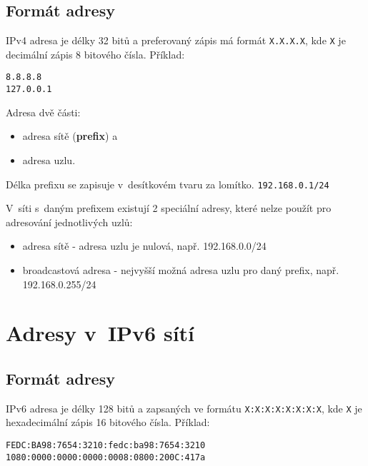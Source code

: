 \subsection{Formát adresy}
IPv4 adresa je délky 32 bitů a preferovaný zápis má formát {\tt X.X.X.X}, kde
{\tt X} je decimální zápis 8 bitového čísla. Příklad:\\
\begin{verbatim}
8.8.8.8
127.0.0.1
\end{verbatim}

Adresa dvě části:
\begin{itemize}
    \item adresa sítě ({\bf prefix}) a
    \item adresa uzlu.
\end{itemize}
Délka prefixu se zapisuje v~desítkovém tvaru za lomítko. {\tt 192.168.0.1/24}

V~síti s~daným prefixem existují 2 speciální adresy, které nelze použít pro
adresování jednotlivých uzlů:
\begin{itemize}
    \item adresa sítě - adresa uzlu je nulová, např. 192.168.0.0/24
    \item broadcastová adresa - nejvyšší možná adresa uzlu pro daný prefix,
        např. 192.168.0.255/24
\end{itemize}

\section{Adresy v~IPv6 sítí}\label{ipv6-teorie}

\subsection{Formát adresy}
IPv6 adresa je délky 128 bitů a zapsaných ve formátu {\tt X:X:X:X:X:X:X:X}, kde
{\tt X} je hexadecimální zápis 16 bitového čísla.
Příklad:\\
\begin{verbatim}
FEDC:BA98:7654:3210:fedc:ba98:7654:3210
1080:0000:0000:0000:0008:0800:200C:417a
\end{verbatim}

